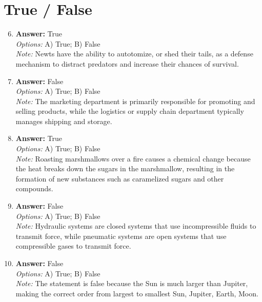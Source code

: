 \documentclass[12pt]{article}
\begin{document}
\section*{True / False}
\begin{enumerate}[label=\arabic*.]
\setcounter{enumi}{5}
\item \textbf{Answer:} True
\\ \textit{Options:} A) True; B) False
\\ \textit{Note:} Newts have the ability to autotomize, or shed their tails, as a defense mechanism to distract predators and increase their chances of survival.
\item \textbf{Answer:} False
\\ \textit{Options:} A) True; B) False
\\ \textit{Note:} The marketing department is primarily responsible for promoting and selling products, while the logistics or supply chain department typically manages shipping and storage.
\item \textbf{Answer:} True
\\ \textit{Options:} A) True; B) False
\\ \textit{Note:} Roasting marshmallows over a fire causes a chemical change because the heat breaks down the sugars in the marshmallow, resulting in the formation of new substances such as caramelized sugars and other compounds.
\item \textbf{Answer:} False
\\ \textit{Options:} A) True; B) False
\\ \textit{Note:} Hydraulic systems are closed systems that use incompressible fluids to transmit force, while pneumatic systems are open systems that use compressible gases to transmit force.
\item \textbf{Answer:} False
\\ \textit{Options:} A) True; B) False
\\ \textit{Note:} The statement is false because the Sun is much larger than Jupiter, making the correct order from largest to smallest Sun, Jupiter, Earth, Moon.
\end{enumerate}
\end{document}
